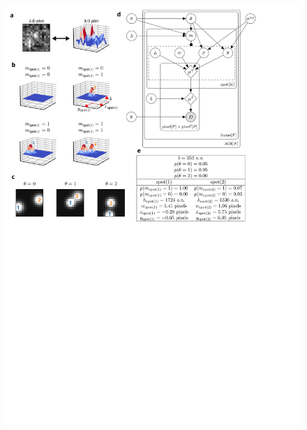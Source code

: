 \begin{figure}[t]
\centering
\includegraphics[width=183mm]{figures/figure2/figure2.png}
\label{fig:tapqir_model}
\end{figure}

